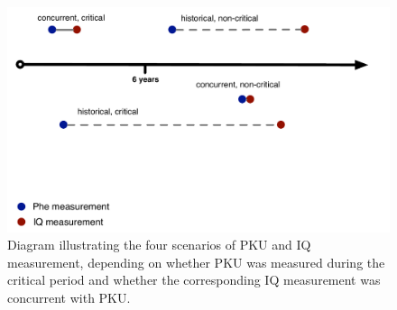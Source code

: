 \documentclass{svjour3}                     %
\begin{document}


%
%
%
%
%
\clearpage

\begin{figure}[p]


    \includegraphics[width=\textwidth]{measurement.pdf}

    \caption{Diagram illustrating the four scenarios of PKU and IQ measurement, depending on whether PKU was measured during the critical period and whether the corresponding IQ measurement was concurrent with PKU.} \label{fig:measurement}

\end{figure}
\end{document}
